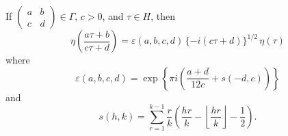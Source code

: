 If $\begin{pmatrix} a & b \\ c & d \end{pmatrix} \in \Gamma$, $c > 0$, and $\tau \in H$, then
$$\eta\!\left( \frac{a\tau + b}{c\tau + d} \right) = \varepsilon(a, b, c, d)\,\{-i(c\tau + d)\}^{1/2}\,\eta(\tau)$$
where
$$\varepsilon(a, b, c, d) = \exp\!\left\{ \pi i \left( \frac{a + d}{12c} + s(-d, c) \right) \right\}$$
and
$$s(h, k) = \sum_{r=1}^{k-1} \frac{r}{k} \left( \frac{hr}{k} - \left\lfloor \frac{hr}{k} \right\rfloor - \frac{1}{2} \right).$$
